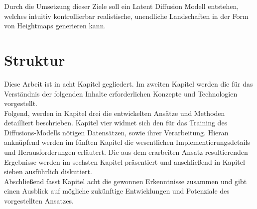 Durch die Umsetzung dieser Ziele soll ein Latent Diffusion Modell entstehen, welches intuitiv kontrollierbar realistische, unendliche Landschaften in der Form von Heightmaps generieren kann.

\section{Struktur}

Diese Arbeit ist in acht Kapitel gegliedert. Im zweiten Kapitel werden die für das Verständnis der folgenden Inhalte erforderlichen Konzepte und Technologien vorgestellt. \\
Folgend, werden in Kapitel drei die entwickelten Ansätze und Methoden detailliert beschrieben. Kapitel vier widmet sich den für das Training des Diffusions-Modells nötigen Datensätzen, sowie ihrer Verarbeitung. Hieran anknüpfend werden im fünften Kapitel die wesentlichen Implementierungsdetails und Herausforderungen erläutert. Die aus dem erarbeiten Ansatz resultierenden Ergebnisse werden im sechsten Kapitel präsentiert und anschließend in Kapitel sieben ausführlich diskutiert. \\
Abschließend fasst Kapitel acht die gewonnen Erkenntnisse zusammen und gibt einen Ausblick auf mögliche zukünftige Entwicklungen und Potenziale des vorgestellten Ansatzes.